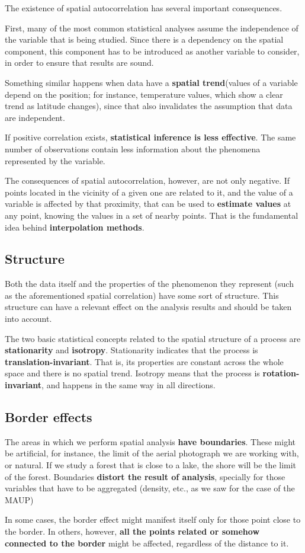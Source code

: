 The existence of spatial autocorrelation has several important consequences.

First, many of the most common statistical analyses assume the independence of the variable that is being studied. Since there is a dependency on the spatial component, this component has to be introduced as another variable to consider, in order to ensure that results are sound.

Something similar happens when data have a \textbf{spatial trend}(values of a variable depend on the position; for instance, temperature values, which show a clear trend as latitude changes), since that also invalidates the assumption that data are independent.

If positive correlation exists, \textbf{statistical inference is less effective}. The same number of observations contain less information about the phenomena represented by the variable.

The consequences of spatial autocorrelation, however, are not only negative. If points located in the vicinity of a given one are related to it, and the value of a variable is affected by that proximity, that can be used to \textbf{estimate values} at any point, knowing the values in a set of nearby points. That is the fundamental idea behind \textbf{interpolation methods}.


\subsection{Structure}

Both the data itself and the properties of the phenomenon they represent (such as the aforementioned spatial correlation) have some sort of structure. This structure can have a relevant effect on the analysis results and should be taken into account.

The two basic statistical concepts related to the spatial structure of a process are \textbf{stationarity} and \textbf{isotropy}. Stationarity indicates that the process is \textbf{translation-invariant}. That is, its properties are constant across the whole space and there is no spatial trend. Isotropy means that the process is \textbf{rotation-invariant}, and happens in the same way in all directions.

\subsection{Border effects}

The areas in which we perform spatial analysis \textbf{have boundaries}. These might be artificial, for instance, the limit of the aerial photograph we are working with, or natural. If we study a forest that is close to a lake, the shore will be the limit of the forest. Boundaries \textbf{distort the result of analysis}, specially for those variables that have to be aggregated (density, etc., as we saw for the case of the MAUP)

In some cases, the border effect might manifest itself only for those point close to the border. In others, however, \textbf{all the points related or somehow connected to the border} might be affected, regardless of the distance to it.

\pagestyle{empty}
